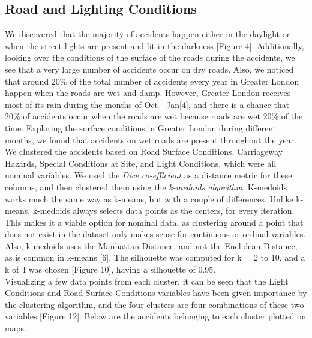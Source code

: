 \documentclass{neu_handout}
\begin{document}
\subsection{Road and Lighting Conditions}

We discovered that the majority of accidents happen either in the daylight or when the street lights are present and lit in the darkness [Figure 4]. Additionally, looking over the conditions of the surface of the roads during the accidents, we see that a very large number of accidents occur on dry roads. Also, we noticed that around 20\% of the total number of accidents every year in Greater London happen when the roads are wet and damp. However, Greater London receives most of its rain during the months of Oct - Jan[4], and there is a chance that 20\% of accidents occur when the roads are wet because roads are wet 20\% of the time. Exploring the surface conditions in Greater London during different months, we found that accidents on wet roads are present throughout the year.\\

We clustered the accidents based on Road Surface Conditions, Carriageway Hazards, Special Conditions at Site, and Light Conditions, which were all nominal variables. We used the \textit{Dice co-efficient} as a distance metric for these columns, and then clustered them using the \textit{k-medoids algorithm}. K-medoids works much the same way as k-means, but with a couple of differences. Unlike k-means, k-medoids always selects data points as the centers, for every iteration. This makes it a viable option for nominal data, as clustering around a point that does not exist in the dataset only makes sense for continuous or ordinal variables. Also, k-medoids uses the Manhattan Distance, and not the Euclidean Distance, as is common in k-means [6]. The silhouette was computed for k = 2 to 10, and a k of 4 was chosen [Figure 10], having a silhouette of 0.95. \\

Visualizing a few data points from each cluster, it can be seen that the Light Conditions and Road Surface Conditions variables have been given importance by the clustering algorithm, and the four clusters are four combinations of these two variables [Figure 12]. Below are the accidents belonging to each cluster plotted on maps. \\ 
\end{document}

